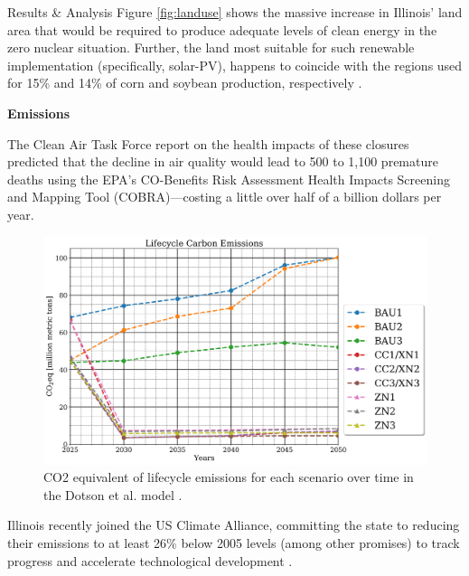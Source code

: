 \documentclass[final]{beamer}
\newlength{\onecolwid}
\newlength{\threecolwid}
\begin{document}
\begin{frame}[t]
\begin{columns}[t,totalwidth=\threecolwid]
\begin{column}{\onecolwid}
\begin{block}{Results \& Analysis}
Figure \ref{fig:landuse} shows the massive increase in Illinois' land area that would be required to produce adequate levels of clean energy in the zero nuclear situation. Further, the land most suitable for such renewable implementation (specifically, solar-PV), happens to coincide with the regions used for 15\% and 14\% of corn and soybean production, respectively \cite{schleusener}.

\vspace{0.7em}
\textbf{Emissions}
\vspace{0.7em}

The Clean Air Task Force report \cite{health} on the health impacts of these closures predicted that the decline in air quality would lead to 500 to 1,100 premature deaths using the EPA’s CO-Benefits Risk Assessment Health Impacts Screening and Mapping Tool (COBRA)---costing a little over half of a billion dollars per year.
\begin{figure}[ht]
  \centering
  \includegraphics[scale=0.7]{co2eq_all_comparison.png}
  \caption{CO2 equivalent of lifecycle emissions for each scenario over time in the Dotson et al. model \cite{dotson}.}
  \label{fig:co2eq_time}
\end{figure}

Illinois recently joined the US Climate Alliance, committing the state to reducing their emissions to at least 26$\%$ below 2005 levels (among other promises) to track progress and accelerate technological development \cite{climate}.

\end{block}



\end{column} %


\end{columns}
\end{frame}
\end{document}
